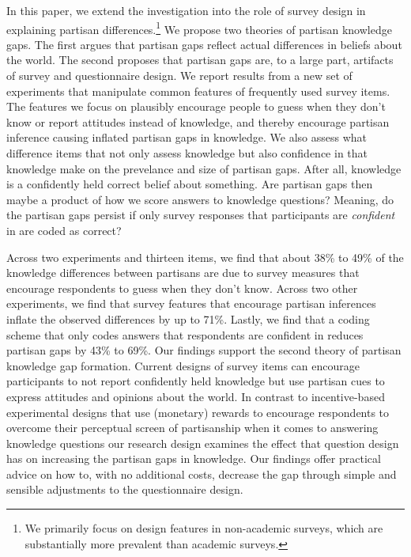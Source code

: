 \documentclass[12pt, letterpaper]{article}
\begin{document}
In this paper, we extend the investigation into the role of survey design in explaining partisan differences.\footnote{We primarily focus on design features in non-academic surveys, which are substantially more prevalent than academic surveys.} We propose two theories of partisan knowledge gaps. The first argues that partisan gaps reflect actual differences in beliefs about the world. The second proposes that partisan gaps are, to a large part, artifacts of survey and questionnaire design. We report results from a new set of experiments that manipulate common features of frequently used survey items. The features we focus on plausibly encourage people to guess when they don't know or report attitudes instead of knowledge, and thereby encourage partisan inference causing inflated partisan gaps in knowledge. We also assess what difference items that not only assess knowledge but also confidence in that knowledge make on the prevelance and size of partisan gaps. After all, knowledge is a confidently held correct belief about something. Are partisan gaps then maybe a product of how we score answers to knowledge questions? Meaning, do the partisan gaps persist if only survey responses that participants are \emph{confident} in are coded as correct?


Across two experiments and thirteen items, we find that about 38\% to 49\% of the knowledge differences between partisans are due to survey measures that encourage respondents to guess when they don't know. Across two other experiments, we find that survey features that encourage partisan inferences inflate the observed differences by up to 71\%. Lastly, we find that a coding scheme that only codes answers that respondents are confident in reduces partisan gaps by 43\% to 69\%. Our findings support the second theory of partisan knowledge gap formation. Current designs of survey items can encourage participants to not report confidently held knowledge but use partisan cues to express attitudes and opinions about the world. In contrast to incentive-based experimental designs that use (monetary) rewards to encourage respondents to overcome their perceptual screen of partisanship when it comes to answering knowledge questions \citep[for example, see][]{bullocketal_2015, peterson2021partisan} our research design examines the effect that question design has on increasing the partisan gaps in knowledge. Our findings offer practical advice on how to, with no additional costs, decrease the gap through simple and sensible adjustments to the questionnaire design.
\end{document}
